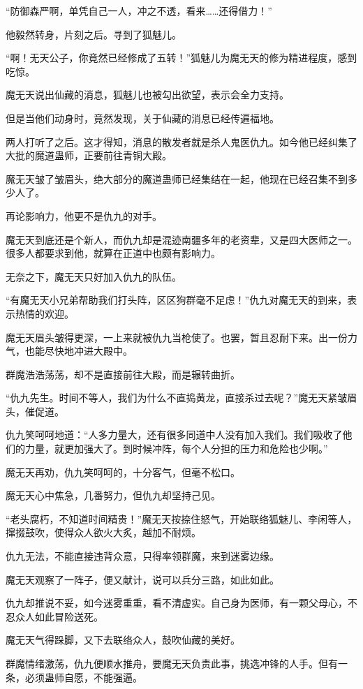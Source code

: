 \begin{this_body}
“防御森严啊，单凭自己一人，冲之不透，看来……还得借力！”

他毅然转身，片刻之后。寻到了狐魅儿。

“啊！无天公子，你竟然已经修成了五转！”狐魅儿为魔无天的修为精进程度，感到吃惊。

魔无天说出仙藏的消息，狐魅儿也被勾出欲望，表示会全力支持。

但是当他们动身时，竟然发现，关于仙藏的消息已经传遍福地。

两人打听了之后。这才得知，消息的散发者就是杀人鬼医仇九。如今他已经纠集了大批的魔道蛊师，正要前往青铜大殿。

魔无天皱了皱眉头，绝大部分的魔道蛊师已经集结在一起，他现在已经召集不到多少人了。

再论影响力，他更不是仇九的对手。

魔无天到底还是个新人，而仇九却是混迹南疆多年的老资辈，又是四大医师之一。很多人都要求到他，就算在正道中也颇有影响力。

无奈之下，魔无天只好加入仇九的队伍。

“有魔无天小兄弟帮助我们打头阵，区区狗群毫不足虑！”仇九对魔无天的到来，表示热情的欢迎。

魔无天眉头皱得更深，一上来就被仇九当枪使了。也罢，暂且忍耐下来。出一份力气，也能尽快地冲进大殿中。

群魔浩浩荡荡，却不是直接前往大殿，而是辗转曲折。

“仇九先生。时间不等人，我们为什么不直捣黄龙，直接杀过去呢？”魔无天紧皱眉头，催促道。

仇九笑呵呵地道：“人多力量大，还有很多同道中人没有加入我们。我们吸收了他们的力量，就更加强大了。到时候冲阵，每个人分担的压力和危险也少啊。”

魔无天再劝，仇九笑呵呵的，十分客气，但毫不松口。

魔无天心中焦急，几番努力，但仇九却坚持己见。

“老头腐朽，不知道时间精贵！”魔无天按捺住怒气，开始联络狐魅儿、李闲等人，撺掇鼓吹，使得众人欲火大炙，越加不耐烦。

仇九无法，不能直接违背众意，只得率领群魔，来到迷雾边缘。

魔无天观察了一阵子，便又献计，说可以兵分三路，如此如此。

仇九却推说不妥，如今迷雾重重，看不清虚实。自己身为医师，有一颗父母心，不忍众人如此冒险送死。

魔无天气得跺脚，又下去联络众人，鼓吹仙藏的美好。

群魔情绪激荡，仇九便顺水推舟，要魔无天负责此事，挑选冲锋的人手。但有一条，必须蛊师自愿，不能强逼。


\end{this_body}

